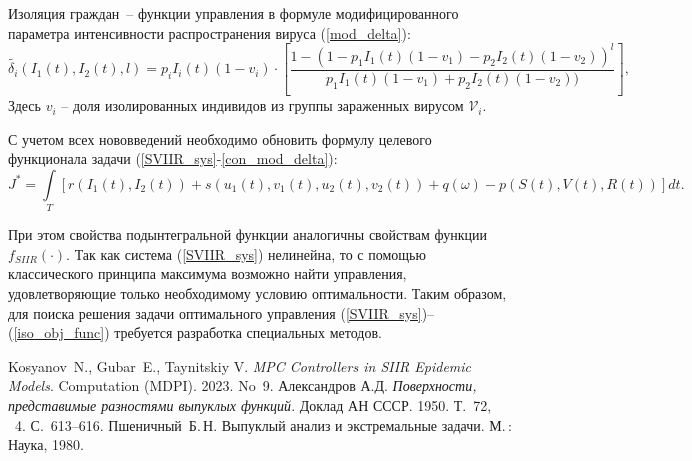 Изоляция граждан~-- функции управления в формуле модифицированного параметра интенсивности распространения вируса (\ref{mod_delta}):
\begin{equation}\label{con_mod_delta} \tag{2*}
    \widetilde{\delta_i}(I_1(t),I_2(t),l) = p_i I_i(t) (1-v_i) \cdot \left[ \frac{1-(1 - p_1 I_1(t)(1-v_1) - p_2 I_2(t)(1-v_2))^l}{p_1 I_1(t)(1-v_1) + p_2 I_2(t)(1-v_2))} \right],
\end{equation}
Здесь $v_i$ -- доля изолированных индивидов из группы зараженных вирусом $\mathcal{V}_i$. 

С учетом всех нововведений необходимо обновить формулу целевого функционала задачи (\ref{SVIIR_sys}-\ref{con_mod_delta}):
\begin{equation}\label{iso_obj_func} \tag{3*}
    J^* = \int\limits_T \left[r(I_1(t),I_2(t)) + s(u_1(t),v_1(t),u_2(t),v_2(t)) + q(\omega) - p(S(t),V(t),R(t)) \right]dt.
\end{equation}

При этом свойства подынтегральной функции аналогичны свойствам функции $f_{SIIR}(\cdot)$. Так как система (\ref{SVIIR_sys}) нелинейна, то с помощью классического принципа максимума возможно найти управления, удовлетворяющие только необходимому условию оптимальности. Таким образом, для поиска решения задачи оптимального управления (\ref{SVIIR_sys})--(\ref{iso_obj_func}) требуется разработка специальных методов.

\begin{thebibliography}{99}
Kosyanov~N., Gubar~E., Taynitskiy V. {\it MPC Controllers in SIIR Epidemic Models}. Computation (MDPI). 2023. No~9.
 Александров А.Д. {\it Поверхности, представимые разностями выпуклых функций}. Доклад АН СССР. 1950. Т.~72,  \textnumero~4. С.~613--616.
Пшеничный~Б.\,Н. Выпуклый анализ и экстремальные задачи.  М.\,: Наука, 1980.
\end{thebibliography}



%

